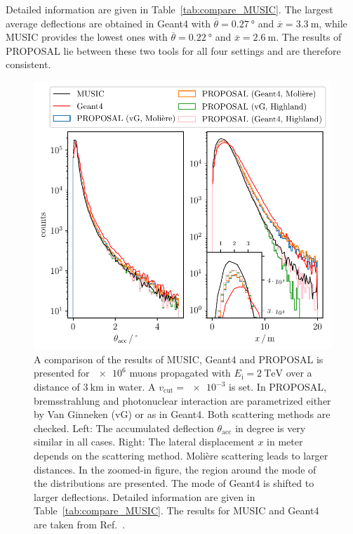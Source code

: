 Detailed information are given in Table~\ref{tab:compare_MUSIC}. 
The largest average deflections are obtained in Geant4 with 
$\overline{\theta} = \SI{0.27}{\degree}$ 
and $\overline{x} = \SI{3.3}{\meter}$, while MUSIC provides the lowest 
ones with $\overline{\theta} = \SI{0.22}{\degree}$ and 
$\overline{x} = \SI{2.6}{\meter}$.
The results of PROPOSAL lie between 
these two tools for all four settings and are therefore consistent. 

\begin{figure}
    \centering 
    \includegraphics{../../deflection/plots/FINAL/2TeV_1e6events_accumulated_defl_paper_combined_zoom.pdf}
    \caption{A comparison of the results of MUSIC, Geant4 and PROPOSAL is presented for $\num{e6}$ muons propagated with 
    $E_{\text{i}} = \SI{2}{\tera\electronvolt}$ over a distance of 
    $\SI{3}{\kilo\meter}$ in water. A $v_{\mathrm{cut}} = \num{e-3}$ is set. In PROPOSAL, 
    bremsstrahlung and photonuclear interaction are parametrized either by 
    Van Ginneken (vG) or as in Geant4. Both scattering methods are checked. 
    Left: The accumulated deflection $\theta_{\mathrm{acc}}$ in degree is very similar in all cases.
    Right: The lateral displacement $x$ in meter depends 
    on the scattering method. Molière scattering leads to larger distances.
    In the zoomed-in figure, the region around the mode of the distributions are presented. 
    The mode of Geant4 is shifted to larger deflections.
    Detailed information are given in 
    Table~\ref{tab:compare_MUSIC}. The results for MUSIC and Geant4 are taken from 
    Ref.~\cite{comparison_MUSIC_GEANT4_2009}.}
    \label{fig:compare_MUSIC}
\end{figure}
